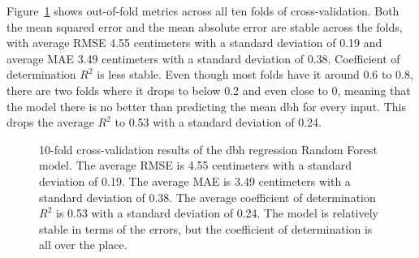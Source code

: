 Figure~\ref{fig-cv-reg} shows out-of-fold metrics across all ten folds of cross-validation.
Both the mean squared error and the mean absolute error are stable across the folds, with average RMSE 4.55 centimeters with a standard deviation of 0.19 and average MAE 3.49 centimeters with a standard deviation of 0.38.
Coefficient of determination $R^2$ is less stable.
Even though most folds have it around 0.6 to 0.8, there are two folds where it drops to below 0.2 and even close to 0, meaning that the model there is no better than predicting the mean dbh for every input.
This drops the average $R^2$ to 0.53 with a standard deviation of 0.24.

\begin{figure}
\caption[Cross-validation results of the dbh regression Random Forest model.]{\label{fig-cv-reg}10-fold cross-validation results of the dbh
regression Random Forest model. The average RMSE is 4.55 centimeters
with a standard deviation of 0.19. The average MAE is 3.49 centimeters
with a standard deviation of 0.38. The average coefficient of
determination \(R^2\) is 0.53 with a standard deviation of 0.24. The
model is relatively stable in terms of the errors, but the coefficient
of determination is all over the place.}
\end{figure}

